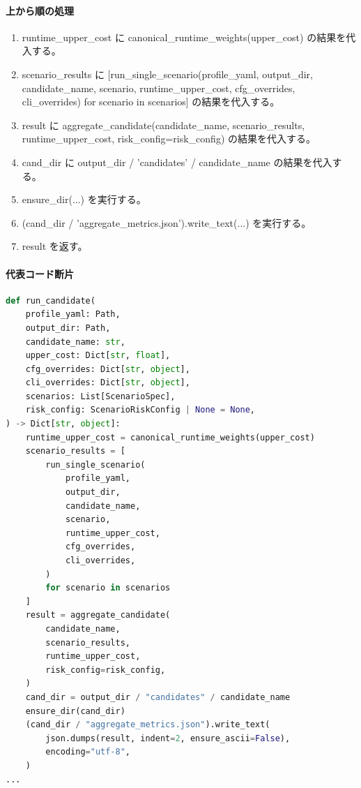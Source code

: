 \documentclass[a4paper,11pt]{article}
\begin{document}
            \paragraph{上から順の処理}
            \begin{enumerate}[leftmargin=1.8em]
            \item runtime\_upper\_cost に canonical\_runtime\_weights(upper\_cost) の結果を代入する。
\item scenario\_results に [run\_single\_scenario(profile\_yaml, output\_dir, candidate\_name, scenario, runtime\_upper\_cost, cfg\_overrides, cli\_overrides) for scenario in scenarios] の結果を代入する。
\item result に aggregate\_candidate(candidate\_name, scenario\_results, runtime\_upper\_cost, risk\_config=risk\_config) の結果を代入する。
\item cand\_dir に output\_dir / 'candidates' / candidate\_name の結果を代入する。
\item ensure\_dir(...) を実行する。
\item (cand\_dir / 'aggregate\_metrics.json').write\_text(...) を実行する。
\item result を返す。
            \end{enumerate}
            \paragraph{代表コード断片}
            \begin{lstlisting}[language=Python]
def run_candidate(
    profile_yaml: Path,
    output_dir: Path,
    candidate_name: str,
    upper_cost: Dict[str, float],
    cfg_overrides: Dict[str, object],
    cli_overrides: Dict[str, object],
    scenarios: List[ScenarioSpec],
    risk_config: ScenarioRiskConfig | None = None,
) -> Dict[str, object]:
    runtime_upper_cost = canonical_runtime_weights(upper_cost)
    scenario_results = [
        run_single_scenario(
            profile_yaml,
            output_dir,
            candidate_name,
            scenario,
            runtime_upper_cost,
            cfg_overrides,
            cli_overrides,
        )
        for scenario in scenarios
    ]
    result = aggregate_candidate(
        candidate_name,
        scenario_results,
        runtime_upper_cost,
        risk_config=risk_config,
    )
    cand_dir = output_dir / "candidates" / candidate_name
    ensure_dir(cand_dir)
    (cand_dir / "aggregate_metrics.json").write_text(
        json.dumps(result, indent=2, ensure_ascii=False),
        encoding="utf-8",
    )
...
\end{lstlisting}
\end{document}
